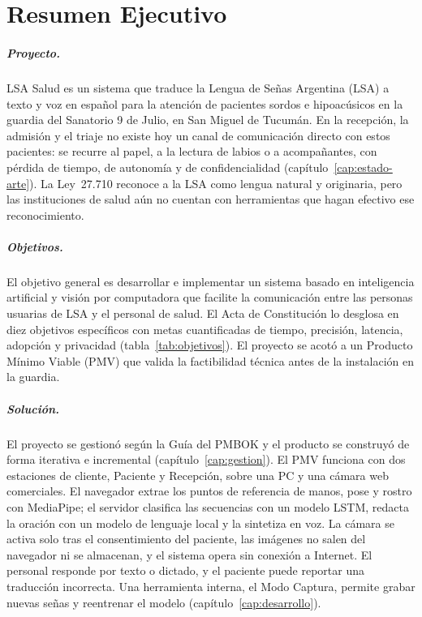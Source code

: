 \chapter{Resumen Ejecutivo}\label{cap:resumen-ejecutivo}

\paragraph{Proyecto.} LSA Salud es un sistema que traduce la Lengua de Señas Argentina (LSA) a texto y voz en español para la atención de pacientes sordos e hipoacúsicos en la guardia del Sanatorio 9 de Julio, en San Miguel de Tucumán. En la recepción, la admisión y el triaje no existe hoy un canal de comunicación directo con estos pacientes: se recurre al papel, a la lectura de labios o a acompañantes, con pérdida de tiempo, de autonomía y de confidencialidad (capítulo~\ref{cap:estado-arte}). La Ley~27.710 reconoce a la LSA como lengua natural y originaria, pero las instituciones de salud aún no cuentan con herramientas que hagan efectivo ese reconocimiento.

\paragraph{Objetivos.} El objetivo general es desarrollar e implementar un sistema basado en inteligencia artificial y visión por computadora que facilite la comunicación entre las personas usuarias de LSA y el personal de salud. El Acta de Constitución lo desglosa en diez objetivos específicos con metas cuantificadas de tiempo, precisión, latencia, adopción y privacidad (tabla~\ref{tab:objetivos}). El proyecto se acotó a un Producto Mínimo Viable (PMV) que valida la factibilidad técnica antes de la instalación en la guardia.

\paragraph{Solución.} El proyecto se gestionó según la Guía del PMBOK y el producto se construyó de forma iterativa e incremental (capítulo~\ref{cap:gestion}). El PMV funciona con dos estaciones de cliente, Paciente y Recepción, sobre una PC y una cámara web comerciales. El navegador extrae los puntos de referencia de manos, pose y rostro con MediaPipe; el servidor clasifica las secuencias con un modelo LSTM, redacta la oración con un modelo de lenguaje local y la sintetiza en voz. La cámara se activa solo tras el consentimiento del paciente, las imágenes no salen del navegador ni se almacenan, y el sistema opera sin conexión a Internet. El personal responde por texto o dictado, y el paciente puede reportar una traducción incorrecta. Una herramienta interna, el Modo Captura, permite grabar nuevas señas y reentrenar el modelo (capítulo~\ref{cap:desarrollo}).

